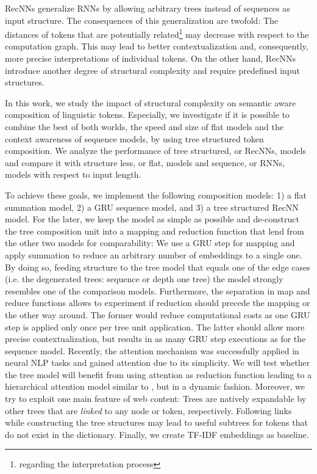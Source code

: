 \acp{RecNN} generalize \acp{RNN} by allowing arbitrary trees instead of sequences as input structure. The consequences of this generalization are twofold: The distances of tokens that are potentially related\footnote{regarding the interpretation process} may decrease with respect to the computation graph. This may lead to better contextualization and, consequently, more precise interpretations of individual tokens. On the other hand, \acp{RecNN} introduce another degree of structural complexity and require predefined input structures. 

In this work, we study the impact of structural complexity on semantic aware composition of linguistic tokens. Especially, we investigate if it is possible to combine the best of both worlds, the speed and size of flat models and the context awareness of sequence models, by using tree structured token composition. We analyze the performance of tree structured, or \acp{RecNN}, models and compare it with structure less, or flat, models and sequence, or \acp{RNN}, models with respect to input length.

To achieve these goals, we implement the following composition models: 1) a flat summation model, 2) a \ac{GRU} sequence model, and 3) a tree structured \ac{RecNN} model. For the later, we keep the model as simple as possible and de-construct the tree composition unit into a mapping and reduction function that lend from the other two models for comparability: We use a \ac{GRU} step for mapping and apply summation to reduce an arbitrary number of embeddings to a single one. By doing so, feeding structure to the tree model that equals one of the edge cases (i.e. the degenerated trees: sequence or depth one tree) the model strongly resembles one of the comparison models. Furthermore, the separation in map and reduce functions allows to experiment if reduction should precede the mapping or the other way around. The former would reduce computational costs as one \ac{GRU} step is applied only once per tree unit application. The latter should allow more precise contextualization, but results in as many \ac{GRU} step executions as for the sequence model. Recently, the attention mechanism \autocite{bahdanau_neural_2014,xu_show_2015} was successfully applied in neural \ac{NLP} tasks \autocite{zhuang_neobility_2017,vaswani_attention_2017} and gained attention due to its simplicity. We will test whether the tree model will benefit from using attention as reduction function leading to a hierarchical attention model similar to \textcite{yang_hierarchical_2016}, but in a dynamic fashion. Moreover, we try to exploit one main feature of web content: Trees are natively expandable by other trees that are \textit{linked} to any node or token, respectively. Following links while constructing the tree structures may lead to useful subtrees for tokens that do not exist in the dictionary. Finally, we create \ac{TF-IDF} embeddings as baseline.   

